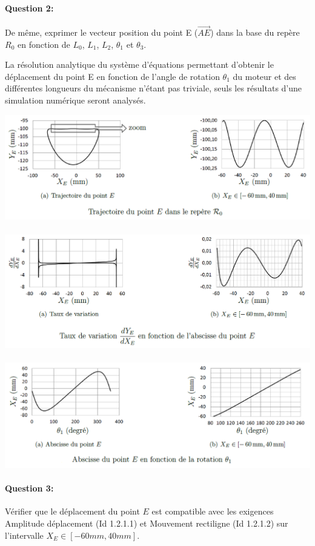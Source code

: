 \paragraph{Question 2:} De même, exprimer le vecteur position du point E ($\overrightarrow{AE}$) dans la base du repère $R_0$ en fonction de $L_0$, $L_1$, $L_2$, $\theta_1$  et $\theta_3$.

La résolution analytique du système d'équations permettant d'obtenir le déplacement du point E en fonction de l'angle de rotation $\theta_1$ du moteur et des différentes longueurs du mécanisme n'étant pas triviale, seuls les résultats d'une simulation numérique seront analysés.

\begin{center}
 \includegraphics[width=0.9\linewidth]{img/Figure6} \\ ~\ \\
 \includegraphics[width=0.9\linewidth]{img/Figure7} \\ ~\ \\
 \includegraphics[width=0.9\linewidth]{img/Figure8}
\end{center}

\paragraph{Question 3:} Vérifier que le déplacement du point $E$ est compatible avec les exigences \og Amplitude déplacement \fg (Id 1.2.1.1) et \og Mouvement rectiligne \fg (Id 1.2.1.2) sur l'intervalle $X_E\in[-60mm,40mm]$.

